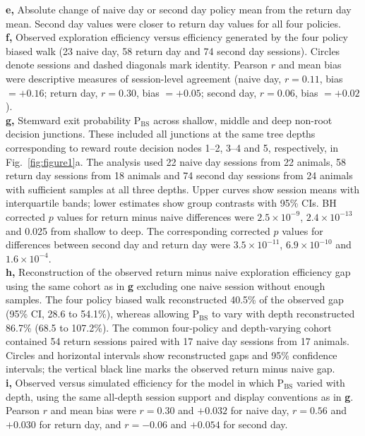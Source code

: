 \documentclass[fleqn,10pt]{wlscirep}
\makeatletter
\newcommand{\labeltoimage}[1]{%
  \begingroup
  \edef\@currentHref{\csname imagehref@#1\endcsname}%
  \label{#1}%
  \endgroup
}
\makeatother
\begin{document}
{\textbf{e,} Absolute change of naive day or second day policy mean from the return day mean. Second day values were closer to return day values for all four policies. \\
\textbf{f,} Observed exploration efficiency versus efficiency generated by the four policy biased walk (23 naive day, 58 return day and 74 second day sessions). Circles denote sessions and dashed diagonals mark identity. Pearson $r$ and mean bias were descriptive measures of session-level agreement (naive day, $r=0.11$, bias $=+0.16$; return day, $r=0.30$, bias $=+0.05$; second day, $r=0.06$, bias $=+0.02$).\\
\textbf{g,} Stemward exit probability $\mathrm{P}_{\mathrm{BS}}$ across shallow, middle and deep non-root decision junctions. These included all junctions at the same tree depths corresponding to reward route decision nodes 1–2, 3–4 and 5, respectively, in Fig.~\ref{fig:figure1}a. The analysis used 22 naive day sessions from 22 animals, 58 return day sessions from 18 animals and 74 second day sessions from 24 animals with sufficient samples at all three depths. Upper curves show session means with interquartile bands; lower estimates show group contrasts with 95\% CIs. BH corrected $p$ values for return minus naive differences were $2.5\times10^{-9}$, $2.4\times10^{-13}$ and 0.025 from shallow to deep. The corresponding corrected $p$ values for differences between second day and return day were $3.5\times10^{-11}$, $6.9\times10^{-10}$ and $1.6\times10^{-4}$.\\
\textbf{h,} Reconstruction of the observed return minus naive exploration efficiency gap using the same cohort as in \textbf{g} excluding one naive session without enough samples. The four policy biased walk reconstructed 40.5\% of the observed gap (95\% CI, 28.6 to 54.1\%), whereas allowing $\mathrm{P}_{\mathrm{BS}}$ to vary with depth reconstructed 86.7\% (68.5 to 107.2\%). The common four-policy and depth-varying cohort contained 54 return sessions paired with 17 naive day sessions from 17 animals. Circles and horizontal intervals show reconstructed gaps and 95\% confidence intervals; the vertical black line marks the observed return minus naive gap.\\
\textbf{i,} Observed versus simulated efficiency for the model in which $\mathrm{P}_{\mathrm{BS}}$ varied with depth, using the same all-depth session support and display conventions as in \textbf{g}. Pearson $r$ and mean bias were $r=0.30$ and $+0.032$ for naive day, $r=0.56$ and $+0.030$ for return day, and $r=-0.06$ and $+0.054$ for second day. 
}
\labeltoimage{fig:ed02}
\end{document}
